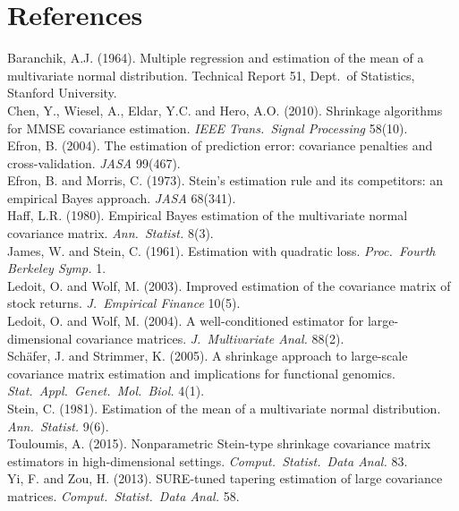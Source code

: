 \documentclass[12pt]{article}
\begin{document}
\section*{References}
\small
Baranchik, A.J. (1964). Multiple regression and estimation of the mean of a multivariate normal
distribution. Technical Report 51, Dept.\ of Statistics, Stanford University.\\
Chen, Y., Wiesel, A., Eldar, Y.C. and Hero, A.O. (2010). Shrinkage algorithms for MMSE covariance
estimation. \textit{IEEE Trans.\ Signal Processing} 58(10).\\
Efron, B. (2004). The estimation of prediction error: covariance penalties and cross-validation.
\textit{JASA} 99(467).\\
Efron, B. and Morris, C. (1973). Stein's estimation rule and its competitors: an empirical Bayes
approach. \textit{JASA} 68(341).\\
Haff, L.R. (1980). Empirical Bayes estimation of the multivariate normal covariance matrix.
\textit{Ann.\ Statist.} 8(3).\\
James, W. and Stein, C. (1961). Estimation with quadratic loss. \textit{Proc.\ Fourth Berkeley Symp.} 1.\\
Ledoit, O. and Wolf, M. (2003). Improved estimation of the covariance matrix of stock returns.
\textit{J.\ Empirical Finance} 10(5).\\
Ledoit, O. and Wolf, M. (2004). A well-conditioned estimator for large-dimensional covariance matrices.
\textit{J.\ Multivariate Anal.} 88(2).\\
Sch\"afer, J. and Strimmer, K. (2005). A shrinkage approach to large-scale covariance matrix estimation
and implications for functional genomics. \textit{Stat.\ Appl.\ Genet.\ Mol.\ Biol.} 4(1).\\
Stein, C. (1981). Estimation of the mean of a multivariate normal distribution. \textit{Ann.\ Statist.} 9(6).\\
Touloumis, A. (2015). Nonparametric Stein-type shrinkage covariance matrix estimators in high-dimensional
settings. \textit{Comput.\ Statist.\ Data Anal.} 83.\\
Yi, F. and Zou, H. (2013). SURE-tuned tapering estimation of large covariance matrices.
\textit{Comput.\ Statist.\ Data Anal.} 58.
\end{document}
